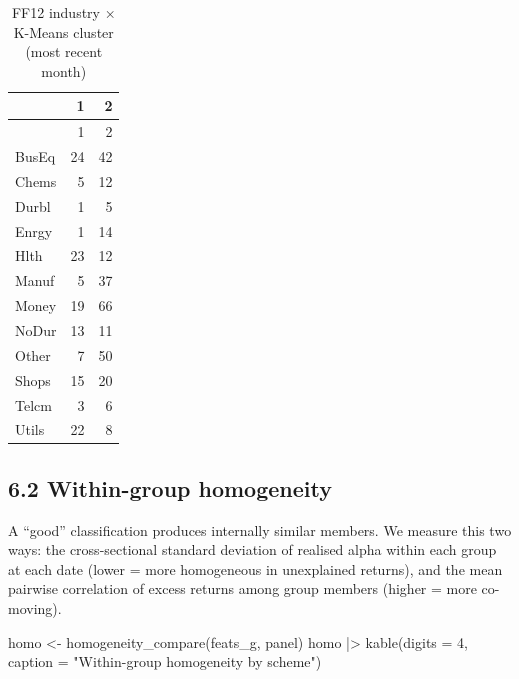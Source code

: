 \documentclass[
  letterpaper,
  DIV=11,
  numbers=noendperiod]{scrartcl}
\newenvironment{Shaded}{\begin{snugshade}}{\end{snugshade}}
\newcommand{\AttributeTok}[1]{\textcolor[rgb]{0.40,0.45,0.13}{#1}}
\newcommand{\DecValTok}[1]{\textcolor[rgb]{0.68,0.00,0.00}{#1}}
\newcommand{\FunctionTok}[1]{\textcolor[rgb]{0.28,0.35,0.67}{#1}}
\newcommand{\NormalTok}[1]{\textcolor[rgb]{0.00,0.23,0.31}{#1}}
\newcommand{\OtherTok}[1]{\textcolor[rgb]{0.00,0.23,0.31}{#1}}
\newcommand{\SpecialCharTok}[1]{\textcolor[rgb]{0.37,0.37,0.37}{#1}}
\newcommand{\StringTok}[1]{\textcolor[rgb]{0.13,0.47,0.30}{#1}}
\begin{document}
\begin{longtable}[]{@{}lrr@{}}
\caption{FF12 industry × K-Means cluster (most recent
month)}\tabularnewline
\toprule\noalign{}
& 1 & 2 \\
\midrule\noalign{}
\endfirsthead
\toprule\noalign{}
& 1 & 2 \\
\midrule\noalign{}
\endhead
\bottomrule\noalign{}
\endlastfoot
BusEq & 24 & 42 \\
Chems & 5 & 12 \\
Durbl & 1 & 5 \\
Enrgy & 1 & 14 \\
Hlth & 23 & 12 \\
Manuf & 5 & 37 \\
Money & 19 & 66 \\
NoDur & 13 & 11 \\
Other & 7 & 50 \\
Shops & 15 & 20 \\
Telcm & 3 & 6 \\
Utils & 22 & 8 \\
\end{longtable}

\subsection{6.2 Within-group
homogeneity}\label{within-group-homogeneity}

A ``good'' classification produces internally similar members. We
measure this two ways: the cross-sectional standard deviation of
realised alpha within each group at each date (lower = more homogeneous
in unexplained returns), and the mean pairwise correlation of excess
returns among group members (higher = more co-moving).

\begin{Shaded}
\begin{Highlighting}[]
\NormalTok{homo }\OtherTok{\textless{}{-}} \FunctionTok{homogeneity\_compare}\NormalTok{(feats\_g, panel)}
\NormalTok{homo }\SpecialCharTok{|\textgreater{}} \FunctionTok{kable}\NormalTok{(}\AttributeTok{digits =} \DecValTok{4}\NormalTok{, }\AttributeTok{caption =} \StringTok{"Within{-}group homogeneity by scheme"}\NormalTok{)}
\end{Highlighting}
\end{Shaded}
\end{document}
